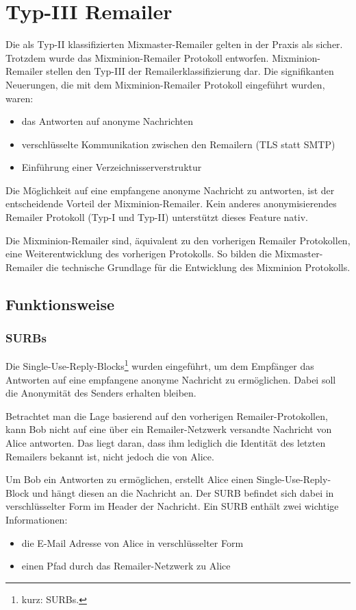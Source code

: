\chapter{Typ-III Remailer}
Die als Typ-II klassifizierten Mixmaster-Remailer gelten in der Praxis als sicher. Trotzdem wurde das Mixminion-Remailer Protokoll entworfen. Mixminion-Remailer stellen den Typ-III der Remailerklassifizierung dar. Die signifikanten Neuerungen, die mit dem Mixminion-Remailer Protokoll eingeführt wurden, waren:
\begin{itemize}
\item das Antworten auf anonyme Nachrichten
\item verschlüsselte Kommunikation zwischen den Remailern (TLS statt SMTP)
\item Einführung einer Verzeichnisserverstruktur
\end{itemize}

Die Möglichkeit auf eine empfangene anonyme Nachricht zu antworten, ist der entscheidende Vorteil der Mixminion-Remailer. Kein anderes anonymisierendes Remailer Protokoll (Typ-I und Typ-II) unterstützt dieses Feature nativ.

Die Mixminion-Remailer sind, äquivalent zu den vorherigen Remailer Protokollen, eine Weiterentwicklung des vorherigen Protokolls. So bilden die Mixmaster-Remailer die technische Grundlage für die Entwicklung des Mixminion Protokolls.

\section{Funktionsweise}
\subsection{SURBs}
Die Single-Use-Reply-Blocks\footnote{kurz: SURBs.} wurden eingeführt, um dem Empfänger das Antworten auf eine empfangene anonyme Nachricht zu ermöglichen. Dabei soll die Anonymität des  Senders erhalten bleiben.

Betrachtet man die Lage basierend auf den vorherigen Remailer-Protokollen, kann Bob nicht auf eine über ein Remailer-Netzwerk versandte Nachricht von Alice antworten. Das liegt daran, dass ihm lediglich die Identität des letzten Remailers bekannt ist, nicht jedoch die von Alice.

Um Bob ein Antworten zu ermöglichen, erstellt Alice einen Single-Use-Reply-Block und hängt diesen an die Nachricht an. Der SURB befindet sich dabei in verschlüsselter Form im Header der Nachricht. 
Ein SURB enthält zwei wichtige Informationen:
\begin{itemize}
\item die E-Mail Adresse von Alice in verschlüsselter Form
\item einen Pfad durch das Remailer-Netzwerk zu Alice
\end{itemize}

